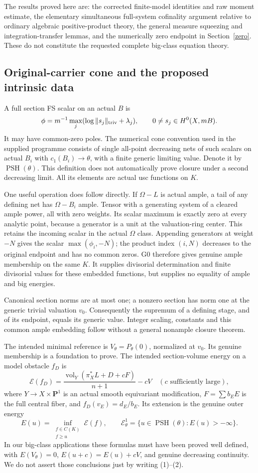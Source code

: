 \documentclass[10pt]{article}
\newcommand{\PSH}{\operatorname{PSH}}
\newcommand{\vol}{\operatorname{vol}}
\newcommand{\E}{\mathcal E}
\begin{document}
The results proved here are: the corrected finite-model identities and
raw moment estimate, the elementary simultaneous full-system cofinality
argument relative to ordinary algebraic positive-product theory, the
general measure squeezing and integration-transfer lemmas, and the
numerically zero endpoint in Section~\ref{zero}. These do not constitute
the requested complete big-class equation theory.

\subsection{Original-carrier cone and the proposed intrinsic data}
A full section FS scalar on an actual $B$ is
\[
 \phi=m^{-1}\max_j(\log\|s_j\|_{\rm triv}+\lambda_j),
 \qquad 0\ne s_j\in H^0(X,mB).
\]
It may have common-zero poles. The numerical cone convention used in
the supplied programme consists of single all-point decreasing nets of
such scalars on actual $B_i$ with $c_1(B_i)\to\theta$, with a finite
generic limiting value. Denote it by $\PSH(\theta)$. This definition
does not automatically prove closure under a second decreasing limit.
All its elements are actual usc functions on $K$.

One useful operation does follow directly. If $\Omega-L$ is actual ample,
a tail of any defining net has $\Omega-B_i$ ample. Tensor with a
generating system of a cleared ample power, all with zero weights.
Its scalar maximum is exactly zero at every analytic point, because a
generator is a unit at the valuation-ring center. This retains the
incoming scalar in the actual $\Omega$ class. Appending generators at
weight $-N$ gives the scalar $\max(\phi_i,-N)$; the product index
$(i,N)$ decreases to the original endpoint and has no common zeros.
G0 therefore gives genuine ample membership on the same $K$.
It supplies divisorial determination and finite divisorial values for
these embedded functions, but supplies no equality of ample and big
energies.

Canonical section norms are at most one; a nonzero section has norm
one at the generic trivial valuation $v_0$. Consequently the supremum
of a defining stage, and of its endpoint, equals its generic value.
Integer scaling, constants and this common ample embedding follow
without a general nonample closure theorem.

The intended minimal reference is $V_\theta=P_\theta(0)$, normalized at
$v_0$. Its genuine membership is a foundation to prove. The intended
section-volume energy on a model obstacle $f_D$ is
\[
 \mathscr E(f_D)=\frac{\vol_Y(\pi_X^*L+D+cF)}{n+1}-cV
 \quad(c\text{ sufficiently large}),                         \tag{1}
\]
where $Y\to X\times\mathbf P^1$ is an actual smooth equivariant
modification, $F=\sum b_EE$ is the full central fiber, and
$f_D(v_E)=d_E/b_E$. Its extension is the genuine outer energy
\[
 E(u)=\inf_{\substack{f\in C(K)\\f\geq u}}\mathscr E(f),\qquad
 \E^1_\theta=\{u\in\PSH(\theta):E(u)>-\infty\}.                 \tag{2}
\]
In our big-class applications these formulas must have been proved
well defined, with $E(V_\theta)=0$, $E(u+c)=E(u)+cV$, and genuine
decreasing continuity. We do not assert those conclusions just by
writing (1)--(2).
\end{document}
